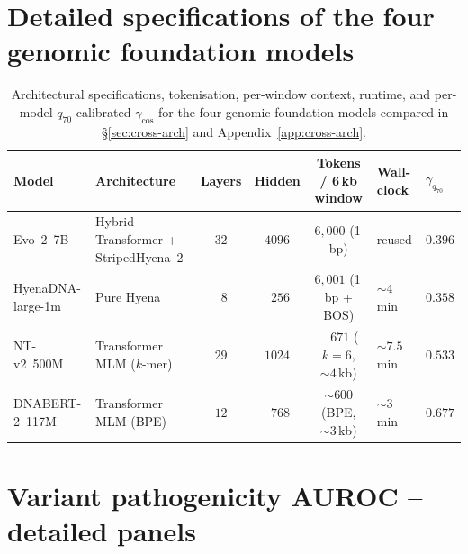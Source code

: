 \documentclass{article}
\theoremstyle{plain}
\theoremstyle{definition}
\theoremstyle{remark}
\begin{document}
\section{Detailed specifications of the four genomic foundation models}
\label{app:fm-specs}

\begin{table}[h]
\caption{Architectural specifications, tokenisation, per-window context,
runtime, and per-model $q_{70}$-calibrated $\gamma_{\cos}$ for the four
genomic foundation models compared in \S\ref{sec:cross-arch} and
Appendix~\ref{app:cross-arch}.}
\label{tab:fm-specs}
\centering
\footnotesize
\setlength{\tabcolsep}{4pt}
\begin{tabular}{@{}llcccll@{}}
\toprule
Model & Architecture & Layers & Hidden & Tokens / 6\,kb window
   & Wall-clock & $\gamma_{q_{70}}$ \\
\midrule
Evo~2~7B          & Hybrid Transformer + StripedHyena~2 & $32$ & $4096$
   & $6{,}000$ (1\,bp)         & reused      & $0.396$ \\
HyenaDNA-large-1m & Pure Hyena                          & $\phantom{0}8$ & $\phantom{0}256$
   & $6{,}001$ (1\,bp + BOS)   & $\sim 4$\,min    & $0.358$ \\
NT-v2~500M        & Transformer MLM ($k$-mer)           & $29$ & $1024$
   & $\phantom{0,}671$ ($k=6$, $\sim 4$\,kb) & $\sim 7.5$\,min  & $0.533$ \\
DNABERT-2~117M    & Transformer MLM (BPE)               & $12$ & $\phantom{0}768$
   & $\sim 600$ (BPE, $\sim 3$\,kb)        & $\sim 3$\,min    & $0.677$ \\
\bottomrule
\end{tabular}
\end{table}

\section{Variant pathogenicity AUROC -- detailed panels}
\label{app:auroc-detail}
\end{document}
